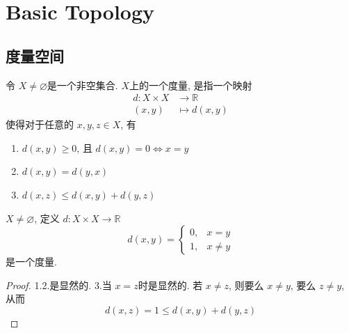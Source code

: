 \documentclass[../main.tex]{subfiles}
\begin{document}
\chapter{Basic Topology}

\section{度量空间}

\begin{definition}{}{}
    令 \(  X \neq \varnothing  \)是一个非空集合.  \(  X  \)上的一个度量, 是指一个映射 \[
    \begin{aligned}
    d: X\times X&\to \mathbb{R} \\ 
     \left( x,y\right)&\mapsto d\left( x,y \right)   
    \end{aligned}
    \]使得对于任意的 \(  x,y,z\in X  \), 有
    \begin{enumerate}
        \item \(  d\left( x,y \right)\ge 0   \), 且 \(  d\left( x,y \right)= 0   \iff  x= y\)  
        \item \(  d\left( x,y \right)= d\left( y,x \right)    \) 
        \item \(  d\left( x,z \right)\le d\left( x,y \right)+ d\left( y,z \right)     \)  
    \end{enumerate}
       
\end{definition}

\begin{example}{}{}
    \(  X\neq \varnothing  \), 定义 \(  d:X\times X\to \mathbb{R}   \) \[
    d\left( x,y \right)= \begin{cases} 0,&x= y \\ 
     1,&x\neq y\end{cases}  
    \]  是一个度量.
\end{example}
\begin{proof}
    1.2.是显然的. 3.当 \(  x= z  \)时是显然的. 若 \(  x\neq z  \), 则要么 \(  x\neq y  \), 要么 \(  z\neq y  \), 从而 \[
    d\left( x,z \right)= 1\le d\left( x,y \right)  + d\left( y,z \right) 
    \]   
\end{proof}
\end{document}

